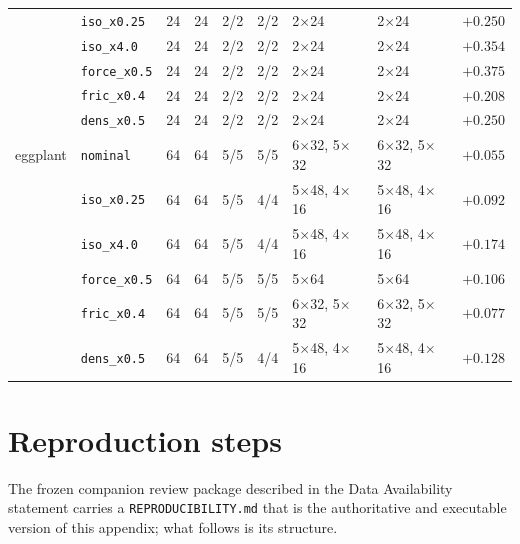 \documentclass[pdflatex,iicol,sn-apa]{sn-jnl}
\theoremstyle{remark}
\begin{document}
\begin{appendices}
\begin{table}[t]
\begin{tabular}{@{}llrrlllll@{}}
 & \texttt{iso\_x0.25} & 24 & 24 & 2/2 & 2/2 & 2$\times$24 & 2$\times$24 & $+0.250$ \\
 & \texttt{iso\_x4.0} & 24 & 24 & 2/2 & 2/2 & 2$\times$24 & 2$\times$24 & $+0.354$ \\
 & \texttt{force\_x0.5} & 24 & 24 & 2/2 & 2/2 & 2$\times$24 & 2$\times$24 & $+0.375$ \\
 & \texttt{fric\_x0.4} & 24 & 24 & 2/2 & 2/2 & 2$\times$24 & 2$\times$24 & $+0.208$ \\
 & \texttt{dens\_x0.5} & 24 & 24 & 2/2 & 2/2 & 2$\times$24 & 2$\times$24 & $+0.250$ \\
\midrule
eggplant & \texttt{nominal} & 64 & 64 & 5/5 & 5/5 & 6$\times$32, 5$\times$32 & 6$\times$32, 5$\times$32 & $+0.055$ \\
 & \texttt{iso\_x0.25} & 64 & 64 & 5/5 & 4/4 & 5$\times$48, 4$\times$16 & 5$\times$48, 4$\times$16 & $+0.092$ \\
 & \texttt{iso\_x4.0} & 64 & 64 & 5/5 & 4/4 & 5$\times$48, 4$\times$16 & 5$\times$48, 4$\times$16 & $+0.174$ \\
 & \texttt{force\_x0.5} & 64 & 64 & 5/5 & 5/5 & 5$\times$64 & 5$\times$64 & $+0.106$ \\
 & \texttt{fric\_x0.4} & 64 & 64 & 5/5 & 5/5 & 6$\times$32, 5$\times$32 & 6$\times$32, 5$\times$32 & $+0.077$ \\
 & \texttt{dens\_x0.5} & 64 & 64 & 5/5 & 4/4 & 5$\times$48, 4$\times$16 & 5$\times$48, 4$\times$16 & $+0.128$ \\
\bottomrule
\end{tabular}
\end{table}

\section{Reproduction steps}\label{secD}

The frozen companion review package described in the Data Availability statement carries a
\texttt{REPRODUCIBILITY.md} that is the authoritative and executable version of this appendix; what
follows is its structure.


\end{appendices}
\end{document}
